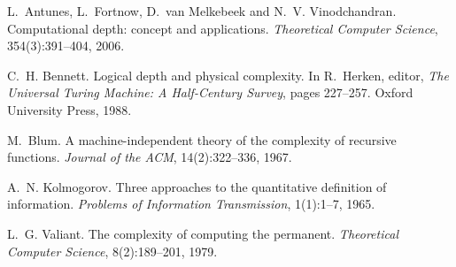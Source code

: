 
L.~Antunes, L.~Fortnow, D.~van Melkebeek and N.~V. Vinodchandran.
\newblock Computational depth: concept and applications.
\newblock \emph{Theoretical Computer Science}, 354(3):391--404, 2006.

C.~H. Bennett.
\newblock Logical depth and physical complexity.
\newblock In R.~Herken, editor, \emph{The Universal Turing Machine: A Half-Century Survey},
pages 227--257. Oxford University Press, 1988.

M.~Blum.
\newblock A machine-independent theory of the complexity of recursive functions.
\newblock \emph{Journal of the ACM}, 14(2):322--336, 1967.

A.~N. Kolmogorov.
\newblock Three approaches to the quantitative definition of information.
\newblock \emph{Problems of Information Transmission}, 1(1):1--7, 1965.

L.~G. Valiant.
\newblock The complexity of computing the permanent.
\newblock \emph{Theoretical Computer Science}, 8(2):189--201, 1979.
